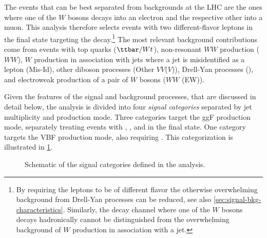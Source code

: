The \HWW events that can be best separated from backgrounds at the LHC are the ones where one of the $W$ bosons decays into an electron and the respective other into a muon.
This analysis therefore selects events with two different-flavor leptons in the final state targeting the \HWWdet decay.\footnote{By requiring the leptons to be of different flavor the otherwise overwhelming background from Drell-Yan processes can be reduced, see also \cref{sec:signal-bkg-characteristics}. Similarly, the decay channel where one of the $W$ bosons decays hadronically cannot be distinguished from the overwhelming background of $W$ production in association with a jet.} 
The most relevant background contributions come from events with top quarks ($\ttbar/Wt$), non-resonant $WW$ production ($WW$), $W$ production in association with jets where a jet is misidentified as a lepton (Mis-Id), other diboson processes (Other $VV$($V$)), Drell-Yan processes (\Zgamma), and electroweak production of a pair of $W$ bosons ($WW$ (EW)). 

Given the features of the signal and background processes, that are discussed in detail below, the analysis is divided into four \emph{signal categories} separated by jet multiplicity and production mode.
Three categories target the ggF production mode, separately treating events with \ZeroJet, \OneJet, and \TwoJet in the final state. One category targets the VBF production mode, also requiring \TwoJet. 
This categorization is illustrated in \cref{fig:signal-categorization}.
\begin{figure}[ht]
    \caption{Schematic of the signal categories defined in the \HWW analysis.}
    \label{fig:signal-categorization}
\end{figure}

